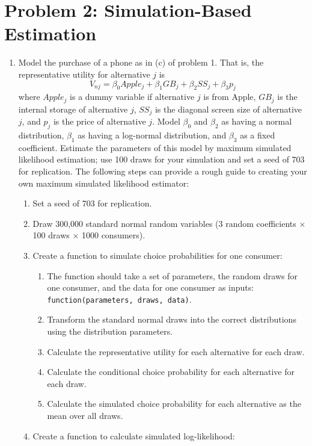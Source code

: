 \documentclass[11pt,letterpaper]{article}\usepackage[]{graphicx}\usepackage[]{color}
\begin{document}
\section*{Problem 2: Simulation-Based Estimation}

\begin{enumerate}[label=\alph*., leftmargin=*]
	\item Model the purchase of a phone as in (c) of problem 1. That is, the representative utility for alternative $j$ is
	$$V_{nj} = \beta_0 Apple_j + \beta_1 GB_j + \beta_2 SS_j + \beta_3 p_j$$
	where $Apple_j$ is a dummy variable if alternative $j$ is from Apple, $GB_j$ is the internal storage of alternative $j$, $SS_j$ is the diagonal screen size of alternative $j$, and $p_j$ is the price of alternative $j$. Model $\beta_0$ and $\beta_2$ as having a normal distribution, $\beta_1$ as having a log-normal distribution, and $\beta_3$ as a fixed coefficient. Estimate the parameters of this model by maximum simulated likelihood estimation; use 100 draws for your simulation and set a seed of 703 for replication. The following steps can provide a rough guide to creating your own maximum simulated likelihood estimator:
	\begin{enumerate}[label=\Roman*.]
		\item Set a seed of 703 for replication.
		\item Draw 300,000 standard normal random variables (3 random coefficients $\times$ 100 draws $\times$ 1000 consumers).
		\item Create a function to simulate choice probabilities for one consumer:
		\begin{enumerate}[label=\roman*.]
			\item The function should take a set of parameters, the random draws for one consumer, and the data for one consumer as inputs: \texttt{function(parameters, draws, data)}.
			\item Transform the standard normal draws into the correct distributions using the distribution parameters.
			\item Calculate the representative utility for each alternative for each draw.
			\item Calculate the conditional choice probability for each alternative for each draw.
			\item Calculate the simulated choice probability for each alternative as the mean over all draws.
		\end{enumerate}
		\item Create a function to calculate simulated log-likelihood:

\end{enumerate}
\end{enumerate}
\end{document}
